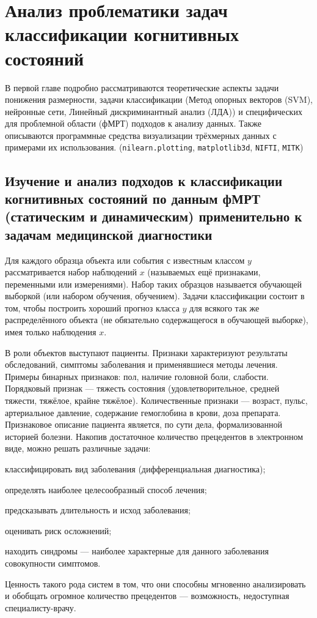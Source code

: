 \chapter{Анализ проблематики задач классификации когнитивных состояний}
\label{chapter1}
\begin{annotation}
	В первой главе подробно рассматриваются теоретические аспекты задачи понижения размерности, задачи классификации (Метод опорных векторов (SVM), нейронные сети, Линейный дискриминантный анализ (ЛДА)) и специфических для проблемной области (фМРТ) подходов к анализу данных. Также описываются программные средства визуализации трёхмерных данных с примерами их использования. (\verb|nilearn.plotting|\cite{10.3389/fninf.2014.00014}, \verb|matplotlib3d|\cite{Hunter:2007}, \verb|NIFTI|, \verb|MITK|\cite{wolf2004medical})
\end{annotation}

\section{Изучение и анализ подходов к классификации когнитивных состояний по данным фМРТ (статическим и динамическим) применительно к задачам медицинской диагностики}
\begin{annotation}
	Для каждого образца объекта или события с известным классом $y$ рассматривается набор наблюдений $x$ (называемых ещё признаками, переменными или измерениями). Набор таких образцов называется обучающей выборкой (или набором обучения, обучением). Задачи классификации состоит в том, чтобы построить хороший прогноз класса $y$ для всякого так же распределённого объекта (не обязательно содержащегося в обучающей выборке), имея только наблюдения $x$.	
\end{annotation}	

В роли объектов выступают пациенты. Признаки характеризуют результаты обследований, симптомы заболевания и применявшиеся методы лечения. Примеры бинарных признаков: пол, наличие головной боли, слабости. Порядковый признак — тяжесть состояния (удовлетворительное, средней тяжести, тяжёлое, крайне тяжёлое). Количественные признаки — возраст, пульс, артериальное давление, содержание гемоглобина в крови, доза препарата. Признаковое описание пациента является, по сути дела, формализованной историей болезни. Накопив достаточное количество прецедентов в электронном виде, можно решать различные задачи:
\begin{compactitem}
	\item классифицировать вид заболевания (дифференциальная диагностика);
	\item определять наиболее целесообразный способ лечения;
	\item предсказывать длительность и исход заболевания;
	\item оценивать риск осложнений;
	\item находить синдромы — наиболее характерные для данного заболевания совокупности симптомов.	
\end{compactitem}
Ценность такого рода систем в том, что они способны мгновенно анализировать и обобщать огромное количество прецедентов — возможность, недоступная специалисту-врачу.


